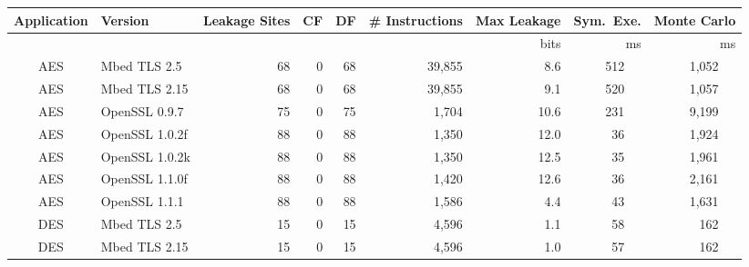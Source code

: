 \begin{table}[h]
{    \begin{tabular}{clrrrrrrr}
        \hline
        \textbf{Application} & \textbf{Version}  & \textbf{Leakage Sites} & \textbf{CF}         & \textbf{DF}
                           & \textbf{\# Instructions} & \textbf{Max Leakage}   & \textbf{Sym.\ Exe.} & \textbf{Monte Carlo}                                                    \\\hline
                           &                          &                        &                     &                      &             & bits & ms        & ms              \\\cline{7-9}
        AES                & Mbed TLS 2.5             & 68                     & 0                   & 68                   & 39,855      & 8.6  & 512 ~~    & 1,052 ~~        \\
        AES                & Mbed TLS 2.15            & 68                     & 0                   & 68                   & 39,855      & 9.1  & 520 ~~    & 1,057 ~~        \\
        AES                & OpenSSL 0.9.7            & 75                     & 0                   & 75                   & 1,704       & 10.6 & 231 ~~    & 9,199 ~~        \\
        AES                & OpenSSL 1.0.2f           & 88                     & 0                   & 88                   & 1,350       & 12.0 & 36 ~~     & 1,924 ~~        \\
        AES                & OpenSSL 1.0.2k           & 88                     & 0                   & 88                   & 1,350       & 12.5 & 35 ~~     & 1,961 ~~        \\
        AES                & OpenSSL 1.1.0f           & 88                     & 0                   & 88                   & 1,420       & 12.6 & 36 ~~     & 2,161 ~~        \\
        AES                & OpenSSL 1.1.1            & 88                     & 0                   & 88                   & 1,586       & 4.4  & 43 ~~     & 1,631 ~~        \\
        DES                & Mbed TLS 2.5             & 15                     & 0                   & 15                   & 4,596       & 1.1  & 58 ~~     & 162 ~~          \\
        DES                & Mbed TLS 2.15            & 15                     & 0                   & 15                   & 4,596       & 1.0  & 57 ~~     & 162 ~~          \\

\end{tabular}}
\end{table}
